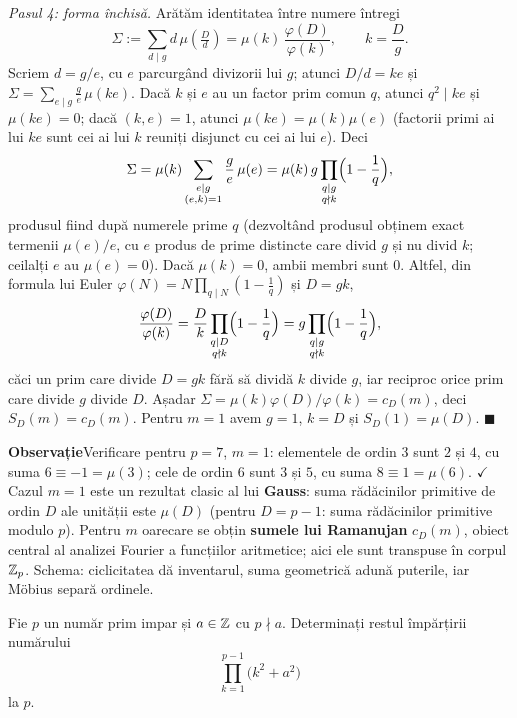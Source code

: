 \begin{solutie}
\emph{Pasul 4: forma închisă.} Arătăm identitatea între numere întregi
\[
  \Sigma:=\sum_{d \mid g} d\,\mu\!\left(\tfrac{D}{d}\right)=\mu(k)\,\frac{\varphi(D)}{\varphi(k)},\qquad k=\frac{D}{g}.
\]
Scriem $d=g/e$, cu $e$ parcurgând divizorii lui $g$; atunci $D/d=ke$ și $\Sigma=\sum_{e\mid g}\frac{g}{e}\,\mu(ke)$. Dacă $k$ și $e$ au un factor prim comun $q$, atunci $q^2\mid ke$ și $\mu(ke)=0$; dacă $(k,e)=1$, atunci $\mu(ke)=\mu(k)\mu(e)$ (factorii primi ai lui $ke$ sunt cei ai lui $k$ reuniți disjunct cu cei ai lui $e$). Deci
\[
  \Sigma=\mu(k)\sum_{\substack{e\mid g\\ (e,k)=1}}\frac{g}{e}\,\mu(e)
  =\mu(k)\,g\prod_{\substack{q\mid g\\ q\nmid k}}\Bigl(1-\frac1q\Bigr),
\]
produsul fiind după numerele prime $q$ (dezvoltând produsul obținem exact termenii $\mu(e)/e$, cu $e$ produs de prime distincte care divid $g$ și nu divid $k$; ceilalți $e$ au $\mu(e)=0$). Dacă $\mu(k)=0$, ambii membri sunt $0$. Altfel, din formula lui Euler $\varphi(N)=N\prod_{q\mid N}(1-\frac1q)$ și $D=gk$,
\[
  \frac{\varphi(D)}{\varphi(k)}=\frac{D}{k}\prod_{\substack{q\mid D\\ q\nmid k}}\Bigl(1-\frac1q\Bigr)=g\prod_{\substack{q\mid g\\ q\nmid k}}\Bigl(1-\frac1q\Bigr),
\]
căci un prim care divide $D=gk$ fără să dividă $k$ divide $g$, iar reciproc orice prim care divide $g$ divide $D$. Așadar $\Sigma=\mu(k)\varphi(D)/\varphi(k)=c_D(m)$, deci $S_D(m)=c_D(m)$. Pentru $m = 1$ avem $g = 1$, $k=D$ și $S_D(1) = \mu(D)$. $\blacksquare$

\medskip
\noindent\textbf{Observație}\quad Verificare pentru $p = 7$, $m = 1$: elementele de ordin $3$ sunt $2$ și $4$, cu suma $6 \equiv -1 = \mu(3)$; cele de ordin $6$ sunt $3$ și $5$, cu suma $8 \equiv 1 = \mu(6)$. $\checkmark$\quad Cazul $m = 1$ este un rezultat clasic al lui \textbf{Gauss}: suma rădăcinilor primitive de ordin $D$ ale unității este $\mu(D)$ (pentru $D = p-1$: suma rădăcinilor primitive modulo $p$). Pentru $m$ oarecare se obțin \textbf{sumele lui Ramanujan} $c_D(m)$, obiect central al analizei Fourier a funcțiilor aritmetice; aici ele sunt transpuse în corpul $\mathbb{Z}_p$. Schema: ciclicitatea dă inventarul, suma geometrică adună puterile, iar Möbius separă ordinele.
\end{solutie}

\begin{problema}
Fie $p$ un număr prim impar și $a \in \mathbb{Z}$ cu $p \nmid a$. Determinați restul împărțirii numărului
\[
  \prod_{k=1}^{p-1}\bigl(k^2 + a^2\bigr)
\]
la $p$.
\end{problema}

